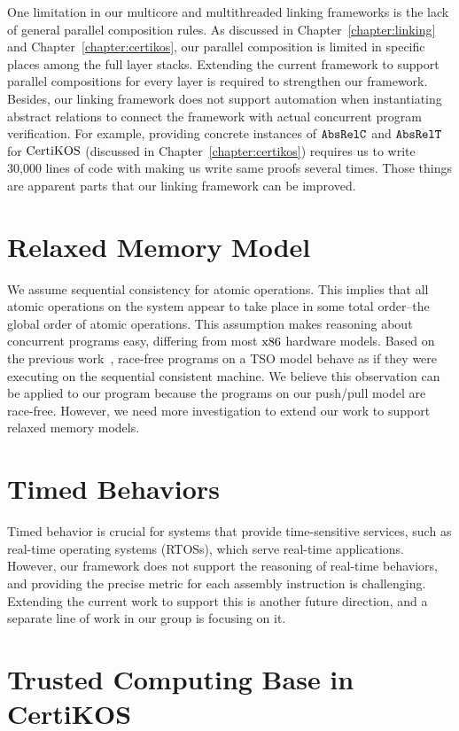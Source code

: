 One limitation in our multicore and multithreaded linking frameworks is the lack of general parallel composition rules. 
As discussed in Chapter~\ref{chapter:linking} and Chapter~\ref{chapter:certikos}, 
our parallel composition is limited in specific places among the full layer stacks. Extending the current framework to support parallel compositions for every layer is required to strengthen our framework.
Besides, our linking framework does not support automation when instantiating abstract relations to connect the framework with actual concurrent program verification.
For example, providing concrete instances of ${{\mathrm{\texttt{AbsRelC}}}}$ and ${{\mathrm{\texttt{AbsRelT}}}}$ for $\mathrm{CertiKOS}$ (discussed in Chapter~\ref{chapter:certikos}) requires us to write 30,000 lines of code with making us write same proofs several times. 
Those things are apparent parts that our linking framework can be improved. 


\section{Relaxed Memory Model}

We assume sequential consistency for atomic operations. 
This implies that all atomic operations on the system appear to take place in some total order--the global order of atomic operations.
This assumption makes reasoning about concurrent programs easy, differing from most $\mathrm{x86}$
 hardware models. Based on the previous work~\cite{sevcik13}, 
race-free programs on a TSO model behave as if they were executing on the sequential consistent machine. 
We believe this observation can be applied to our program because the programs on our push/pull model are race-free. 
However, we need more investigation to extend our work to support relaxed memory models.


\section{Timed Behaviors}

Timed behavior is crucial for systems that provide time-sensitive services, such as real-time operating systems (RTOSs), 
which serve real-time applications. However, our framework does not support the reasoning of real-time behaviors, 
and providing the precise metric for each assembly instruction is challenging. Extending the current work to support 
this is another future direction, and a separate line of work in our group is focusing on it.


\section{Trusted Computing Base in CertiKOS}

